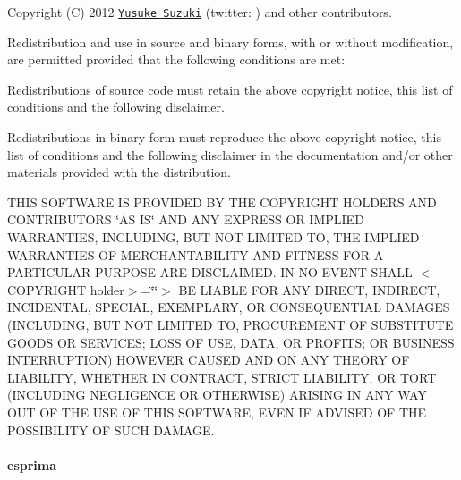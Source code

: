 Copyright (C) 2012 \href{http://github.com/Constellation}{\tt Yusuke Suzuki} (twitter\+: \href{http://twitter.com/Constellation}{\tt }) and other contributors.

Redistribution and use in source and binary forms, with or without modification, are permitted provided that the following conditions are met\+:


\begin{DoxyItemize}
\item Redistributions of source code must retain the above copyright notice, this list of conditions and the following disclaimer.
\item Redistributions in binary form must reproduce the above copyright notice, this list of conditions and the following disclaimer in the documentation and/or other materials provided with the distribution.
\end{DoxyItemize}

T\+H\+IS S\+O\+F\+T\+W\+A\+RE IS P\+R\+O\+V\+I\+D\+ED BY T\+HE C\+O\+P\+Y\+R\+I\+G\+HT H\+O\+L\+D\+E\+RS A\+ND C\+O\+N\+T\+R\+I\+B\+U\+T\+O\+RS \char`\"{}\+A\+S I\+S\char`\"{} A\+ND A\+NY E\+X\+P\+R\+E\+SS OR I\+M\+P\+L\+I\+ED W\+A\+R\+R\+A\+N\+T\+I\+ES, I\+N\+C\+L\+U\+D\+I\+NG, B\+UT N\+OT L\+I\+M\+I\+T\+ED TO, T\+HE I\+M\+P\+L\+I\+ED W\+A\+R\+R\+A\+N\+T\+I\+ES OF M\+E\+R\+C\+H\+A\+N\+T\+A\+B\+I\+L\+I\+TY A\+ND F\+I\+T\+N\+E\+SS F\+OR A P\+A\+R\+T\+I\+C\+U\+L\+AR P\+U\+R\+P\+O\+SE A\+RE D\+I\+S\+C\+L\+A\+I\+M\+ED. IN NO E\+V\+E\+NT S\+H\+A\+LL $<$\+C\+O\+P\+Y\+R\+I\+G\+H\+T holder$>$=\char`\"{}\char`\"{}$>$ BE L\+I\+A\+B\+LE F\+OR A\+NY D\+I\+R\+E\+CT, I\+N\+D\+I\+R\+E\+CT, I\+N\+C\+I\+D\+E\+N\+T\+AL, S\+P\+E\+C\+I\+AL, E\+X\+E\+M\+P\+L\+A\+RY, OR C\+O\+N\+S\+E\+Q\+U\+E\+N\+T\+I\+AL D\+A\+M\+A\+G\+ES (I\+N\+C\+L\+U\+D\+I\+NG, B\+UT N\+OT L\+I\+M\+I\+T\+ED TO, P\+R\+O\+C\+U\+R\+E\+M\+E\+NT OF S\+U\+B\+S\+T\+I\+T\+U\+TE G\+O\+O\+DS OR S\+E\+R\+V\+I\+C\+ES; L\+O\+SS OF U\+SE, D\+A\+TA, OR P\+R\+O\+F\+I\+TS; OR B\+U\+S\+I\+N\+E\+SS I\+N\+T\+E\+R\+R\+U\+P\+T\+I\+ON) H\+O\+W\+E\+V\+ER C\+A\+U\+S\+ED A\+ND ON A\+NY T\+H\+E\+O\+RY OF L\+I\+A\+B\+I\+L\+I\+TY, W\+H\+E\+T\+H\+ER IN C\+O\+N\+T\+R\+A\+CT, S\+T\+R\+I\+CT L\+I\+A\+B\+I\+L\+I\+TY, OR T\+O\+RT (I\+N\+C\+L\+U\+D\+I\+NG N\+E\+G\+L\+I\+G\+E\+N\+CE OR O\+T\+H\+E\+R\+W\+I\+SE) A\+R\+I\+S\+I\+NG IN A\+NY W\+AY O\+UT OF T\+HE U\+SE OF T\+H\+IS S\+O\+F\+T\+W\+A\+RE, E\+V\+EN IF A\+D\+V\+I\+S\+ED OF T\+HE P\+O\+S\+S\+I\+B\+I\+L\+I\+TY OF S\+U\+CH D\+A\+M\+A\+GE.

\paragraph*{esprima}

